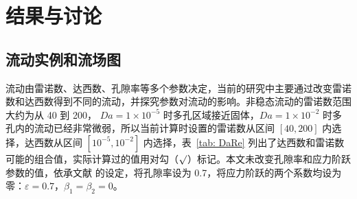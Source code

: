 \chapter{结果与讨论}

\section{流动实例和流场图}

流动由雷诺数、达西数、孔隙率等多个参数决定，当前的研究中主要通过改变雷诺数和达西数得到不同的流动，并探究参数对流动的影响。非稳态流动的雷诺数范围大约为从 40 到 200， $Da=1\times 10^{-5}$ 时多孔区域接近固体，$Da=1\times 10^{-2}$ 时多孔内的流动已经非常微弱，所以当前计算时设置的雷诺数从区间 $[40,200]$ 内选择，达西数从区间 $[10^{-5},10^{-2}]$ 内选择，表~\ref{tab: DaRe} 列出了达西数和雷诺数可能的组合值，实际计算过的值用对勾（$\surd$）标记。本文未改变孔隙率和应力阶跃参数的值，依承文献 \cite{} 的设定，将孔隙率设为 0.7，将应力阶跃的两个系数均设为零：$\varepsilon=0.7$，$\beta_1 = \beta_2=0$。

